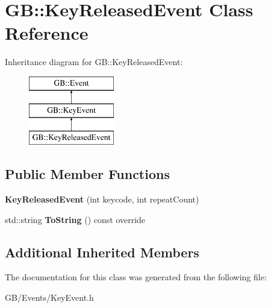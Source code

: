 \hypertarget{class_g_b_1_1_key_released_event}{}\section{GB\+::Key\+Released\+Event Class Reference}
\label{class_g_b_1_1_key_released_event}
Inheritance diagram for GB\+::Key\+Released\+Event\+:\begin{figure}[H]
\begin{center}
\leavevmode
\includegraphics[height=3.000000cm]{class_g_b_1_1_key_released_event}
\end{center}
\end{figure}
\subsection*{Public Member Functions}
\begin{DoxyCompactItemize}
\item 
\mbox{\label{class_g_b_1_1_key_released_event_a5559844459a37aadb9f43222154d9b30}} 
{\bfseries Key\+Released\+Event} (int keycode, int repeat\+Count)
\item 
\mbox{\label{class_g_b_1_1_key_released_event_a069b096a3cec17a1774bb98de87610f7}} 
std\+::string {\bfseries To\+String} () const override
\end{DoxyCompactItemize}
\subsection*{Additional Inherited Members}


The documentation for this class was generated from the following file\+:\begin{DoxyCompactItemize}
\item 
G\+B/\+Events/Key\+Event.\+h\end{DoxyCompactItemize}

